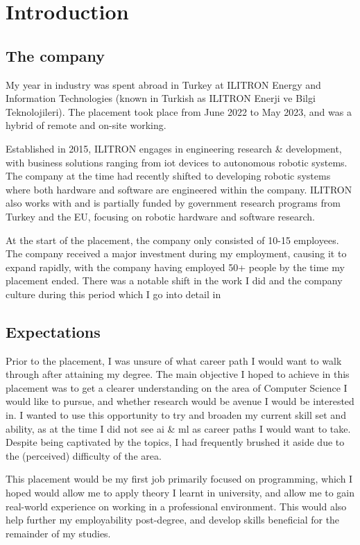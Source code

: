 \chapter{Introduction}

\section{The company}

My year in industry was spent abroad in Turkey at ILITRON Energy and Information Technologies
(known in Turkish as ILITRON Enerji ve Bilgi Teknolojileri).
The placement took place from June 2022 to May 2023, and was a hybrid of remote and on-site working.

Established in 2015, ILITRON engages in engineering research \& development,
with business solutions ranging from \gls{iot} devices to autonomous robotic systems.
The company at the time had recently shifted to developing robotic systems where
both hardware and software are engineered within the company.
ILITRON also works with and is partially funded by government research programs
from Turkey and the EU, focusing on robotic hardware and software research.

At the start of the placement, the company only consisted of 10-15 employees.
The company received a major investment during my employment, causing it to expand rapidly,
with the company having employed 50+ people by the time my placement ended.
There was a notable shift in the work I did and the company culture during this period
which I go into detail in %

\section{Expectations}

Prior to the placement, I was unsure of what career path I would want to walk through
after attaining my degree. The main objective I hoped to achieve in this placement was
to get a clearer understanding on the area of Computer Science I would like to pursue,
and whether research would be avenue I would be interested in.
I wanted to use this opportunity to try and broaden my current skill set and ability,
as at the time I did not see \gls{ai} \& \gls{ml} as career paths I would want to take.
Despite being captivated by the topics, I had frequently brushed it aside due to
the (perceived) difficulty of the area.

This placement would be my first job primarily focused on programming,
which I hoped would allow me to apply theory I learnt in university,
and allow me to gain real-world experience on working in a professional environment.
This would also help further my employability post-degree,
and develop skills beneficial for the remainder of my studies.

